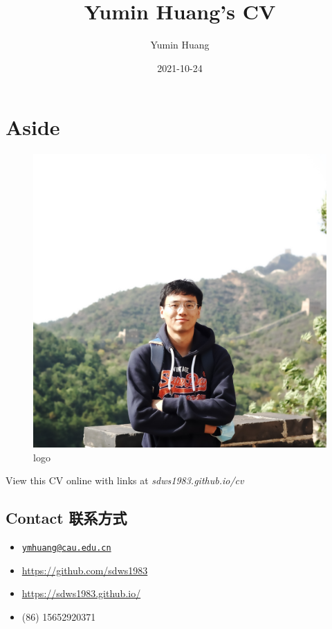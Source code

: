 \documentclass[]{article}
\title{Yumin Huang's CV}
\author{Yumin Huang}
\date{2021-10-24}
\providecommand{\tightlist}{%
  \setlength{\itemsep}{0pt}\setlength{\parskip}{0pt}}
\begin{document}
\maketitle

\hypertarget{aside}{%
\section{Aside}\label{aside}}

\begin{figure}
\centering
\includegraphics[width=1\textwidth,height=\textheight]{ymhuang.jpeg}
\caption{logo}
\end{figure}

View this CV online with links at \emph{sdws1983.github.io/cv}

\hypertarget{contact}{%
\subsection{Contact 联系方式}\label{contact}}

\begin{itemize}
\tightlist
\item
   \href{mailto:ymhuang@cau.edu.cn}{\nolinkurl{ymhuang@cau.edu.cn}}
\item
   \url{https://github.com/sdws1983}
\item
   \url{https://sdws1983.github.io/}
\item
   (86) 15652920371
\end{itemize}
\end{document}
